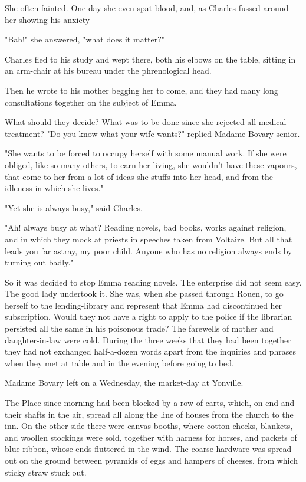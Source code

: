\documentclass{tufte-book}
\begin{document}
She often fainted. One day she even spat blood, and, as Charles fussed
around her showing his anxiety--

"Bah!" she answered, "what does it matter?"

Charles fled to his study and wept there, both his elbows on the table,
sitting in an arm-chair at his bureau under the phrenological head.

Then he wrote to his mother begging her to come, and they had many long
consultations together on the subject of Emma.

What should they decide? What was to be done since she rejected all
medical treatment? "Do you know what your wife wants?" replied Madame
Bovary senior.

"She wants to be forced to occupy herself with some manual work. If she
were obliged, like so many others, to earn her living, she wouldn't have
these vapours, that come to her from a lot of ideas she stuffs into her
head, and from the idleness in which she lives."

"Yet she is always busy," said Charles.

"Ah! always busy at what? Reading novels, bad books, works against
religion, and in which they mock at priests in speeches taken from
Voltaire. But all that leads you far astray, my poor child. Anyone who
has no religion always ends by turning out badly."

So it was decided to stop Emma reading novels. The enterprise did not
seem easy. The good lady undertook it. She was, when she passed through
Rouen, to go herself to the lending-library and represent that Emma had
discontinued her subscription. Would they not have a right to apply
to the police if the librarian persisted all the same in his poisonous
trade? The farewells of mother and daughter-in-law were cold. During
the three weeks that they had been together they had not exchanged
half-a-dozen words apart from the inquiries and phrases when they met at
table and in the evening before going to bed.

Madame Bovary left on a Wednesday, the market-day at Yonville.

The Place since morning had been blocked by a row of carts, which, on
end and their shafts in the air, spread all along the line of houses
from the church to the inn. On the other side there were canvas booths,
where cotton checks, blankets, and woollen stockings were sold,
together with harness for horses, and packets of blue ribbon, whose ends
fluttered in the wind. The coarse hardware was spread out on the ground
between pyramids of eggs and hampers of cheeses, from which sticky straw
stuck out.
\end{document}
